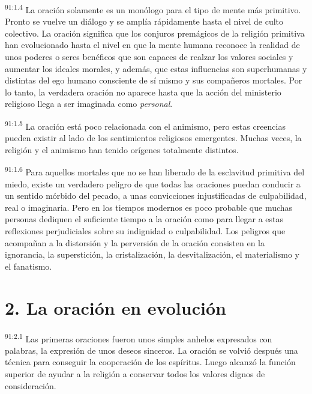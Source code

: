 \par
\textsuperscript{91:1.4} La oración solamente es un monólogo para el tipo de mente más primitivo. Pronto se vuelve un diálogo y se amplía rápidamente hasta el nivel de culto colectivo. La oración significa que los conjuros premágicos de la religión primitiva han evolucionado hasta el nivel en que la mente humana reconoce la realidad de unos poderes o seres benéficos que son capaces de realzar los valores sociales y aumentar los ideales morales, y además, que estas influencias son superhumanas y distintas del ego humano consciente de sí mismo y sus compañeros mortales. Por lo tanto, la verdadera oración no aparece hasta que la acción del ministerio religioso llega a ser imaginada como \textit{personal}.

\par
\textsuperscript{91:1.5} La oración está poco relacionada con el animismo, pero estas creencias pueden existir al lado de los sentimientos religiosos emergentes. Muchas veces, la religión y el animismo han tenido orígenes totalmente distintos.

\par
\textsuperscript{91:1.6} Para aquellos mortales que no se han liberado de la esclavitud primitiva del miedo, existe un verdadero peligro de que todas las oraciones puedan conducir a un sentido mórbido del pecado, a unas convicciones injustificadas de culpabilidad, real o imaginaria. Pero en los tiempos modernos es poco probable que muchas personas dediquen el suficiente tiempo a la oración como para llegar a estas reflexiones perjudiciales sobre su indignidad o culpabilidad. Los peligros que acompañan a la distorsión y la perversión de la oración consisten en la ignorancia, la superstición, la cristalización, la desvitalización, el materialismo y el fanatismo.

\section*{2. La oración en evolución}
\par
\textsuperscript{91:2.1} Las primeras oraciones fueron unos simples anhelos expresados con palabras, la expresión de unos deseos sinceros. La oración se volvió después una técnica para conseguir la cooperación de los espíritus. Luego alcanzó la función superior de ayudar a la religión a conservar todos los valores dignos de consideración.

